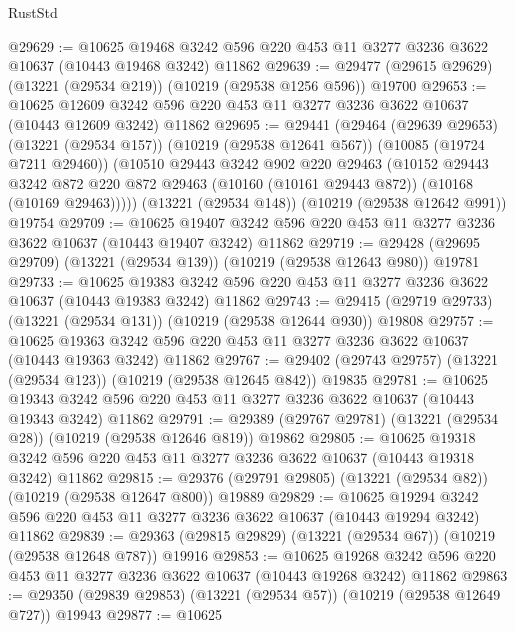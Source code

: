 \begin{lexlean}{RustStd}
\begin{coremodule}
@29629 := @10625
    @19468
    @3242
    @596
    @220
    @453
    @11
    @3277
    @3236
    @3622
    @10637
    (@10443 @19468 @3242)
    @11862
@29639 := @29477 (@29615 @29629) (@13221 (@29534 @219)) (@10219 (@29538 @1256 @596)) @19700
@29653 := @10625
    @12609
    @3242
    @596
    @220
    @453
    @11
    @3277
    @3236
    @3622
    @10637
    (@10443 @12609 @3242)
    @11862
@29695 := @29441
    (@29464
      (@29639 @29653)
      (@13221 (@29534 @157))
      (@10219 (@29538 @12641 @567))
      (@10085 (@19724 @7211 @29460))
      (@10510
        @29443
        @3242
        @902
        @220
        @29463
        (@10152
          @29443
          @3242
          @872
          @220
          @872
          @29463
          (@10160 (@10161 @29443 @872))
          (@10168 (@10169 @29463)))))
    (@13221 (@29534 @148))
    (@10219 (@29538 @12642 @991))
    @19754
@29709 := @10625
    @19407
    @3242
    @596
    @220
    @453
    @11
    @3277
    @3236
    @3622
    @10637
    (@10443 @19407 @3242)
    @11862
@29719 := @29428 (@29695 @29709) (@13221 (@29534 @139)) (@10219 (@29538 @12643 @980)) @19781
@29733 := @10625
    @19383
    @3242
    @596
    @220
    @453
    @11
    @3277
    @3236
    @3622
    @10637
    (@10443 @19383 @3242)
    @11862
@29743 := @29415 (@29719 @29733) (@13221 (@29534 @131)) (@10219 (@29538 @12644 @930)) @19808
@29757 := @10625
    @19363
    @3242
    @596
    @220
    @453
    @11
    @3277
    @3236
    @3622
    @10637
    (@10443 @19363 @3242)
    @11862
@29767 := @29402 (@29743 @29757) (@13221 (@29534 @123)) (@10219 (@29538 @12645 @842)) @19835
@29781 := @10625
    @19343
    @3242
    @596
    @220
    @453
    @11
    @3277
    @3236
    @3622
    @10637
    (@10443 @19343 @3242)
    @11862
@29791 := @29389 (@29767 @29781) (@13221 (@29534 @28)) (@10219 (@29538 @12646 @819)) @19862
@29805 := @10625
    @19318
    @3242
    @596
    @220
    @453
    @11
    @3277
    @3236
    @3622
    @10637
    (@10443 @19318 @3242)
    @11862
@29815 := @29376 (@29791 @29805) (@13221 (@29534 @82)) (@10219 (@29538 @12647 @800)) @19889
@29829 := @10625
    @19294
    @3242
    @596
    @220
    @453
    @11
    @3277
    @3236
    @3622
    @10637
    (@10443 @19294 @3242)
    @11862
@29839 := @29363 (@29815 @29829) (@13221 (@29534 @67)) (@10219 (@29538 @12648 @787)) @19916
@29853 := @10625
    @19268
    @3242
    @596
    @220
    @453
    @11
    @3277
    @3236
    @3622
    @10637
    (@10443 @19268 @3242)
    @11862
@29863 := @29350 (@29839 @29853) (@13221 (@29534 @57)) (@10219 (@29538 @12649 @727)) @19943
@29877 := @10625

\end{coremodule}
\end{lexlean}
